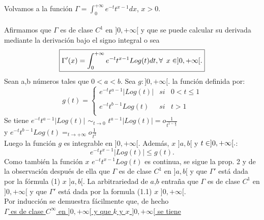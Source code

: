 Volvamos a la función $\Gamma=\int_0^{+\infty}e^{-t}t^{x-1}dx$, \todo \phantom{} \lam $x>0$. \\ \\
Afirmamos que $\Gamma$ es de clase $C^1$ en $]0,+\infty[$ y que se puede calcular su derivada mediante la derivación bajo el signo integral o sea \\

\begin{equation}
\boxed{\Gamma ' (x)=\int_0^{+\infty}e^{-t}t^{x-1}Log(t) dt, \forall \phantom{s} x\in ]0,+\infty[.}
\end{equation}
Sean a,b números tales que $0<a<b$. Sea $g: ]0,+\infty[.$ \flecha \R \phantom{} la función definida por:\\
\begin{equation*}
g(t)= \left\{ \begin{array}{lcc}
            e^{-t}t^{a-1}|Log(t)| &   si  & 0<t \leq 1 \\
             \\  e^{-t}t^{b-1}Log(t) &  si &  t>1 \\
             \end{array}
   \right.
\end{equation*}
Se tiene $e^{-t}t^{a-1}|Log(t)|$ $\sim_{t \to 0}$ $t^{a-1}|Log(t)|= o \frac{1}{t^{1-\frac{a}{2}}}$ \\
y $e^{-t}t^{b-1}Log(t)=_{t \to +\infty}o \frac{1}{t^2}$ \\
Luego la función $g$ es integrable en $]0,+\infty[$. Además, \todo $x$ \en $]a,b[$ y \todo \phantom{} $t \in ]0,+\infty[.$:
$$
e^{-t}t^{x-1}|Log(t)| \leq g(t).
$$
Como también la función $x$ \flecha $e^{-t}t^{x-1}Log(t)$ es continua, se sigue la prop. 2 y de la observación después de ella que $\Gamma$ es de clase $C^1$ en $]a,b[$ y que $\Gamma '$ está dada por la fórmula (1) \todo \phantom{} $x$ \en $]a,b[$. La arbitrariedad de $a$,$b$ entraña que $\Gamma$ es de clase $C^1$ en $]0,+\infty[$ y que $\Gamma '$ está dada por la formula (1.1) \todo \phantom{} $x$ \en $]0,+\infty[$. \\
Por inducción se demuestra fácilmente que, de hecho \\ \underline{$\Gamma$ es de clase  $C^\infty$ en $]0,+\infty[$ y que \todo \phantom{} $k$ \en \N \phantom{} y \todo \phantom{} $x$ \en $]0,+\infty[$ se tiene }\\

